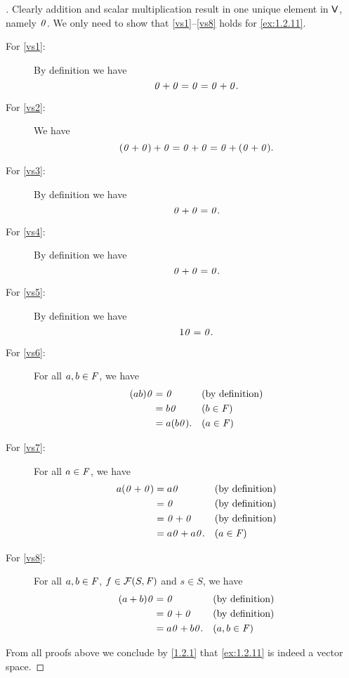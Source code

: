 \begin{proof}[]
  Clearly addition and scalar multiplication result in one unique element in \(\mathsf{V}\), namely \(\mathit{0}\).
  We only need to show that \ref{vs1}--\ref{vs8} holds for \cref{ex:1.2.11}.
  \begin{description}
    \item[For \ref{vs1}:]
      By definition we have
      \[
        \mathit{0} + \mathit{0} = \mathit{0} = \mathit{0} + \mathit{0}.
      \]
    \item[For \ref{vs2}:]
      We have
      \[
        (\mathit{0} + \mathit{0}) + \mathit{0} = \mathit{0} + \mathit{0} = \mathit{0} + (\mathit{0} + \mathit{0}).
      \]
    \item[For \ref{vs3}:]
      By definition we have
      \[
        \mathit{0} + \mathit{0} = \mathit{0}.
      \]
    \item[For \ref{vs4}:]
      By definition we have
      \[
        \mathit{0} + \mathit{0} = \mathit{0}.
      \]
    \item[For \ref{vs5}:]
      By definition we have
      \[
        1\mathit{0} = \mathit{0}.
      \]
    \item[For \ref{vs6}:]
      For all \(a, b \in \mathit{F}\), we have
      \begin{align*}
        (ab) \mathit{0} & = \mathit{0}      &  & \text{(by definition)} \\
                 & = b\mathit{0}     &  & (b \in \mathit{F})             \\
                 & = a(b\mathit{0}). &  & (a \in \mathit{F})
      \end{align*}
    \item[For \ref{vs7}:]
      For all \(a \in \mathit{F}\), we have
      \begin{align*}
        a(\mathit{0} + \mathit{0}) & = a\mathit{0}         &  & \text{(by definition)} \\
                     & = \mathit{0}          &  & \text{(by definition)} \\
                     & = \mathit{0} + \mathit{0}    &  & \text{(by definition)} \\
                     & = a\mathit{0} + a\mathit{0}. &  & (a \in \mathit{F})
      \end{align*}
    \item[For \ref{vs8}:]
      For all \(a, b \in \mathit{F}\), \(f \in \mathcal{F}(S, \mathit{F})\) and \(s \in S\), we have
      \begin{align*}
        (a + b) \mathit{0} & = \mathit{0}          &  & \text{(by definition)} \\
                    & = \mathit{0} + \mathit{0}    &  & \text{(by definition)} \\
                    & = a\mathit{0} + b\mathit{0}. &  & (a, b \in \mathit{F})
      \end{align*}
  \end{description}
  From all proofs above we conclude by \cref{1.2.1} that \cref{ex:1.2.11} is indeed a vector space.
\end{proof}

